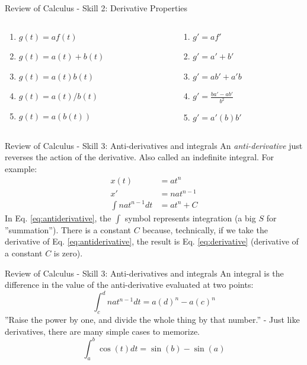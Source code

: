 \documentclass{beamer}
\begin{document}
\begin{frame}{Review of Calculus - Skill 2: Derivative Properties}
\begin{columns}[T]
\begin{column}{0.5\textwidth}
\begin{enumerate}
\item $g(t) = af(t)$
\item $g(t) = a(t) + b(t)$
\item $g(t) = a(t)b(t)$
\item $g(t) = a(t)/b(t)$
\item $g(t) = a(b(t))$
\end{enumerate}
\end{column}
\begin{column}{0.5\textwidth}
\begin{enumerate}
\item $g' = af'$
\item $g' = a'+b'$
\item $g' = ab'+a'b$
\item $g' = \frac{ba'-ab'}{b^2}$
\item $g' = a'(b)b'$
\end{enumerate}
\end{column}
\end{columns}
\end{frame}

\begin{frame}{Review of Calculus - Skill 3: Anti-derivatives and integrals}
An \textit{anti-derivative} just reverses the action of the derivative.  Also called an indefinite integral.  For example:
\begin{align}
x(t) &= at^{n} \\
x' &= nat^{n-1} \label{eq:derivative} \\
\int nat^{n-1} dt &= at^{n} + C \label{eq:antiderivative}
\end{align}
In Eq. \ref{eq:antiderivative}, the $\int$ symbol represents integration (a big $S$ for ''summation'').  There is a constant $C$ because, technically, if we take the derivative of Eq. \ref{eq:antiderivative}, the result is Eq. \ref{eq:derivative} (derivative of a constant $C$ is zero). 
\end{frame}

\begin{frame}{Review of Calculus - Skill 3: Anti-derivatives and integrals}
An integral is the difference in the value of the anti-derivative evaluated at two points:
\begin{equation}
\int_{c}^{d} nat^{n-1} dt = a(d)^n - a(c)^n
\end{equation}
''Raise the power by one, and divide the whole thing by that number.'' - Just like derivatives, there are many simple cases to memorize.
\begin{equation}
\int_{a}^{b} \cos(t) dt = \sin(b) - \sin(a)
\end{equation}
\end{frame}
\end{document}
